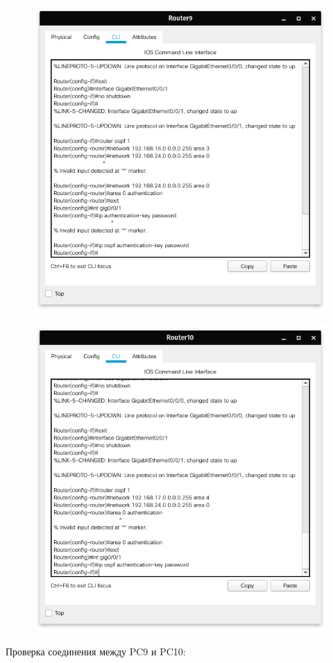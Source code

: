 \begin{figure}[H]
    \centering
    \includegraphics[width=0.8\linewidth]{images/scr07.png}
    \caption{}%
\end{figure}
\begin{figure}[H]
    \centering
    \includegraphics[width=0.8\linewidth]{images/scr08.png}
    \caption{}%
\end{figure}
Проверка соединения между PC9 и PC10:
